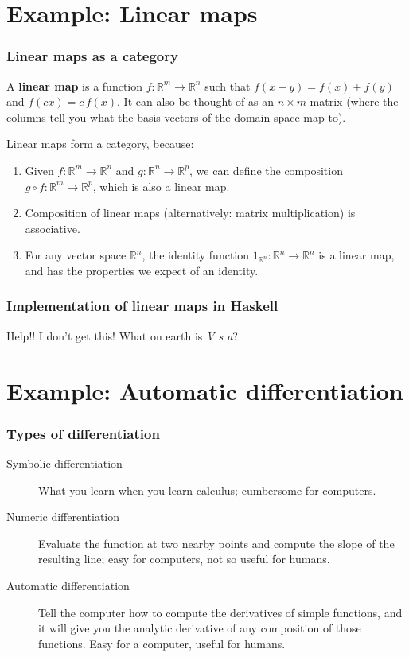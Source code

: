 \documentclass[10pt]{beamer}
\theoremstyle{definition}
\theoremstyle{remark}
\numberwithin{equation}{section}
\begin{document}
\section{Example: Linear maps} %

\begin{frame}[fragile]{}
  \frametitle{Linear maps as a category}

  A \textbf{linear map} is a function $f\colon \mathbb{R}^m \rightarrow \mathbb{R}^n$
  such that $f(x + y) = f(x) + f(y)$ and $f(cx) = c\,f(x)$.
  It can also be thought of as an $n \times m$ matrix (where the columns tell you
  what the basis vectors of the domain space map to).

  Linear maps form a category, because:
  \begin{enumerate}
  \item Given $f\colon \mathbb{R}^m \rightarrow \mathbb{R}^n$ and $g\colon \mathbb{R}^n \rightarrow
    \mathbb{R}^p$, we can define the composition $g \circ f \colon \mathbb{R}^m \rightarrow
    \mathbb{R}^p$, which is also a linear map.
  \item Composition of linear maps (alternatively: matrix multiplication) is
    associative.
  \item For any vector space $\mathbb{R}^n$, the identity function
    $1_{\mathbb{R}^n}\colon \mathbb{R}^n \rightarrow \mathbb{R}^n$ is a linear map, and
    has the properties we expect of an identity.
  \end{enumerate}
\end{frame}

\begin{frame}[fragile]
  \frametitle{Implementation of linear maps in Haskell}

  Help!! I don't get this! What on earth is \emph{V s a}?
\end{frame}

\section{Example: Automatic differentiation}

\begin{frame}[fragile]
  \frametitle{Types of differentiation}

  \begin{description}
  \item[Symbolic differentiation] What you learn when you learn calculus;
    cumbersome for computers.
  \item[Numeric differentiation] Evaluate the function at two nearby points and
    compute the slope of the resulting line; easy for computers, not so useful
    for humans.
  \item[Automatic differentiation] Tell the computer how to compute the
    derivatives of simple functions, and it will give you the analytic
    derivative of any composition of those functions. Easy for a computer,
    useful for humans.
  \end{description}
\end{frame}
\end{document}
